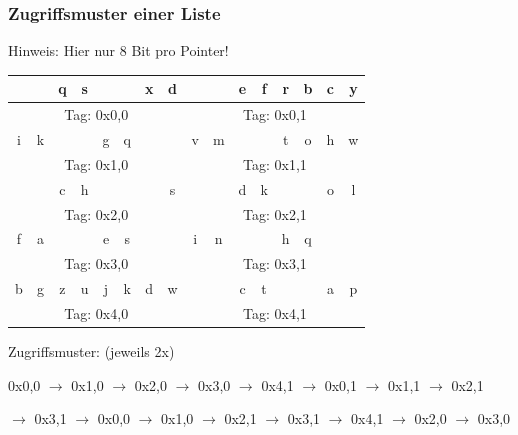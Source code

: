 \documentclass[xcolor=pdftex,dvipsnames,table]{beamer}
\begin{document}
\begin{frame}
	\frametitle{Zugriffsmuster einer Liste}
	Hinweis: Hier nur 8 Bit pro Pointer!
	\begin{tabular}{|c|c|c|c|c|c|c|c|c|c|c|c|c|c|c|c|}
		\hline
		\color{red}{18} & \color{red}{C} & q & s & \color{red}{22} & \color{red}{n} & x & d & \color{red}{26} & \color{red}{s} & e & f  & r & b & c & y \\
		\hline
		\multicolumn{8}{|c|}{Tag: 0x0,0} &
		\multicolumn{8}{c|}{Tag: 0x0,1} \\
		\hline
		\hline
		i & k & \color{red}{36} & \color{red}{a} & g & q & \color{red}{40} & \color{red}{d} & v & m & \color{red}{44} & \color{red}{\_}  & t & o & h & w \\
		\hline
		\multicolumn{8}{|c|}{Tag: 0x1,0} &
		\multicolumn{8}{c|}{Tag: 0x1,1} \\
		\hline
		\hline
		\color{red}{50} & \color{red}{l} & c & h & \color{red}{54} & \color{red}{c} & \  & s & \color{red}{58} & \color{red}{\_} & d & k & \color{red}{62} & \color{red}{s} & o & l \\
		\hline
		\multicolumn{8}{|c|}{Tag: 0x2,0} &
		\multicolumn{8}{c|}{Tag: 0x2,1} \\
		\hline
		\hline
		f & a & \color{red}{0} & \color{red}{l} & e & s & \color{red}{72} & \color{red}{h} & i & n & \color{red}{76} & \color{red}{t}  & h & q & \color{red}{4} & \color{red}{i} \\
		\hline
		\multicolumn{8}{|c|}{Tag: 0x3,0} &
		\multicolumn{8}{c|}{Tag: 0x3,1} \\
		\hline
		\hline
		b & g & z & u & j & k & d & w & \color{red}{8} & \color{red}{e} & c & t & \color{red}{32} & \color{red}{o} & a & p \\
		\hline
		\multicolumn{8}{|c|}{Tag: 0x4,0} &
		\multicolumn{8}{c|}{Tag: 0x4,1} \\
		\hline
	\end{tabular}
	\begin{block}{Zugriffsmuster: (jeweils 2x)}
	\small{
		0x0,0 $\rightarrow$ 0x1,0 $\rightarrow$ 0x2,0 $\rightarrow$ 0x3,0 $\rightarrow$ 0x4,1 $\rightarrow$ 0x0,1 $\rightarrow$ 0x1,1 $\rightarrow$ 0x2,1
		
		$\rightarrow$ 0x3,1 $\rightarrow$ 0x0,0 $\rightarrow$ 0x1,0 $\rightarrow$ 0x2,1 $\rightarrow$ 0x3,1 $\rightarrow$ 0x4,1 $\rightarrow$ 0x2,0 $\rightarrow$ 0x3,0
	}
	\end{block}
\end{frame}
\end{document}
